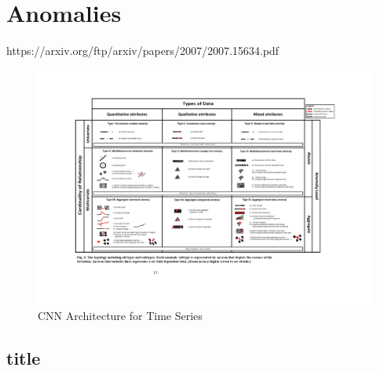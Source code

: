    

\section{Anomalies}
https://arxiv.org/ftp/arxiv/papers/2007/2007.15634.pdf

\begin{figure}[h]
	\centering
	\includegraphics[scale=0.6]{Figures/Anomaly_types_t}
	\decoRule
	\caption[CNN Architecture for Time Series]{CNN Architecture for Time Series \parencite{Munir2019}}
	\label{fig:Anomaly_types}
\end{figure}

\subsection{title}